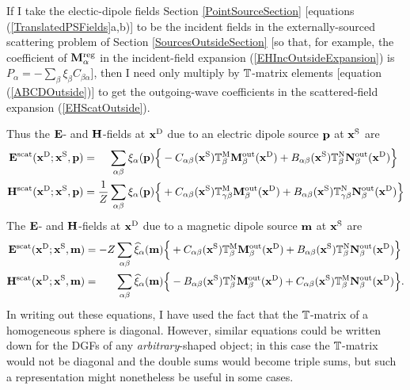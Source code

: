 \documentclass[letterpaper]{article}
\begin{document}
If I take the electic-dipole fields
Section \ref{PointSourceSection}
[equations (\ref{TranslatedPSFields}a,b)]
to be the incident fields in the externally-sourced scattering
problem of Section \ref{SourcesOutsideSection}
[so that, for example, the coefficient of
$\mathbf{M}_\alpha^{\text{\scriptsize reg}}$ in the incident-field expansion
(\ref{EHIncOutsideExpansion}) is
$P_\alpha=-\sum_\beta \xi_\beta C_{\beta\alpha}$],
then I need only multiply by $\mathbb{T}$-matrix elements
[equation (\ref{ABCDOutside})]
to get the outgoing-wave coefficients in the
scattered-field expansion (\ref{EHScatOutside}).

Thus the $\mathbf{E}$- and $\mathbf{H}$-fields at $\mathbf{x}^{\text{\scriptsize D}}$ due to an
electric dipole source $\mathbf{p}$ at $\mathbf{x}^{\text{\scriptsize S}}$ are
\begin{align*}
 \vb E\sups{scat}(\vb x\supt{D}; \vb x\supt{S}, \vb p)
&=\hphantom{\frac{1}{Z}}
    \sum_{\alpha\beta}
    \xi_\alpha(\vb p)
    \Big\{ -C_{\alpha\beta}(\vb x\supt{S}) \mb T\supt{M}_{\beta} \vb M_\beta\sups{out}(\vb x\supt{D})
           +B_{\alpha\beta}(\vb x\supt{S}) \mb T\supt{N}_{\beta} \vb N_\beta\sups{out}(\vb x\supt{D})
    \Big\}
\\
 \vb H\sups{scat}(\vb x\supt{D}; \vb x\supt{S}, \vb p)
&=\frac{1}{Z}\sum_{\alpha\beta}
    \xi_\alpha(\vb p)
    \Big\{ +C_{\alpha\beta}(\vb x\supt{S}) \mb T\supt{M}_{\gamma\beta} \vb M_\beta\sups{out}(\vb x\supt{D})
           +B_{\alpha\beta}(\vb x\supt{S}) \mb T\supt{N}_{\gamma\beta} \vb N_\beta\sups{out}(\vb x\supt{D})
    \Big\}
\end{align*}
The $\mathbf{E}$- and $\mathbf{H}$-fields at $\mathbf{x}^{\text{\scriptsize D}}$ due to a
magnetic dipole source $\mathbf{m}$ at $\mathbf{x}^{\text{\scriptsize S}}$ are
\begin{align*}
 \mathbf{E}^{\text{\scriptsize scat}}(\mathbf{x}^{\text{\scriptsize D}}; \mathbf{x}^{\text{\scriptsize S}}, \mathbf{m})
&=-Z \sum_{\alpha\beta}
    \widehat{\xi}_\alpha(\mathbf{m})
    \Big\{ +C_{\alpha\beta}(\mathbf{x}^{\text{\scriptsize S}}) \mathbb{T}^{\text{\scriptsize M}}_{\beta} \mathbf{M}_\beta^{\text{\scriptsize out}}(\mathbf{x}^{\text{\scriptsize D}})
           +B_{\alpha\beta}(\mathbf{x}^{\text{\scriptsize S}})\mathbb{T}^{\text{\scriptsize N}}_{\beta} \mathbf{N}_\beta^{\text{\scriptsize out}}(\mathbf{x}^{\text{\scriptsize D}})
    \Big\}
\\
 \mathbf{H}^{\text{\scriptsize scat}}(\mathbf{x}^{\text{\scriptsize D}}; \mathbf{x}^{\text{\scriptsize S}}, \mathbf{m})
&=\hphantom{-Z}\sum_{\alpha\beta}
    \widehat{\xi}_\alpha(\mathbf{m})
    \Big\{ -B_{\alpha\beta}(\mathbf{x}^{\text{\scriptsize S}}) \mathbb{T}^{\text{\scriptsize N}}_{\beta} \mathbf{M}_\beta^{\text{\scriptsize out}}(\mathbf{x}^{\text{\scriptsize D}})
           +C_{\alpha\beta}(\mathbf{x}^{\text{\scriptsize S}}) \mathbb{T}^{\text{\scriptsize M}}_{\beta} \mathbf{N}_\beta^{\text{\scriptsize out}}(\mathbf{x}^{\text{\scriptsize D}})
    \Big\}.
\end{align*}
In writing out these equations, I have used the fact that the
$\mathbb{T}$-matrix of a homogeneous sphere is diagonal.
However, similar equations could be written down for the DGFs
of any \textit{arbitrary}-shaped object; in this case 
the $\mathbb{T}$-matrix would not be diagonal and the double sums
would become triple sums, but such a representation might
nonetheless be useful in some cases.
\end{document}
